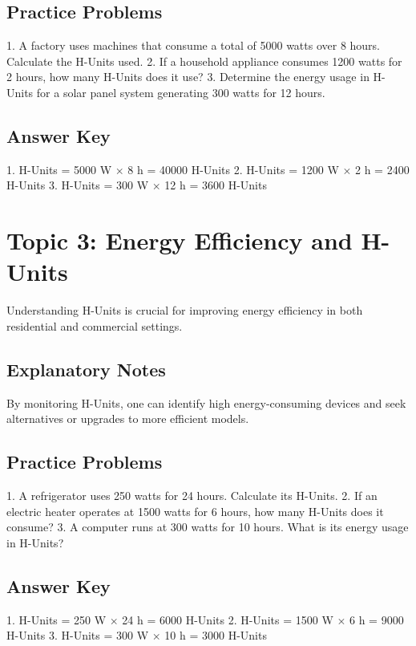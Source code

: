 \documentclass{article}
\begin{document}
\subsection*{Practice Problems}
1. A factory uses machines that consume a total of 5000 watts over 8 hours. Calculate the H-Units used.
2. If a household appliance consumes 1200 watts for 2 hours, how many H-Units does it use?
3. Determine the energy usage in H-Units for a solar panel system generating 300 watts for 12 hours.

\subsection*{Answer Key}
1. H-Units = 5000 W $\times$ 8 h = 40000 H-Units
2. H-Units = 1200 W $\times$ 2 h = 2400 H-Units
3. H-Units = 300 W $\times$ 12 h = 3600 H-Units

\section*{Topic 3: Energy Efficiency and H-Units}
Understanding H-Units is crucial for improving energy efficiency in both residential and commercial settings.

\subsection*{Explanatory Notes}
By monitoring H-Units, one can identify high energy-consuming devices and seek alternatives or upgrades to more efficient models.

\subsection*{Practice Problems}
1. A refrigerator uses 250 watts for 24 hours. Calculate its H-Units.
2. If an electric heater operates at 1500 watts for 6 hours, how many H-Units does it consume?
3. A computer runs at 300 watts for 10 hours. What is its energy usage in H-Units?

\subsection*{Answer Key}
1. H-Units = 250 W $\times$ 24 h = 6000 H-Units
2. H-Units = 1500 W $\times$ 6 h = 9000 H-Units
3. H-Units = 300 W $\times$ 10 h = 3000 H-Units
\end{document}
